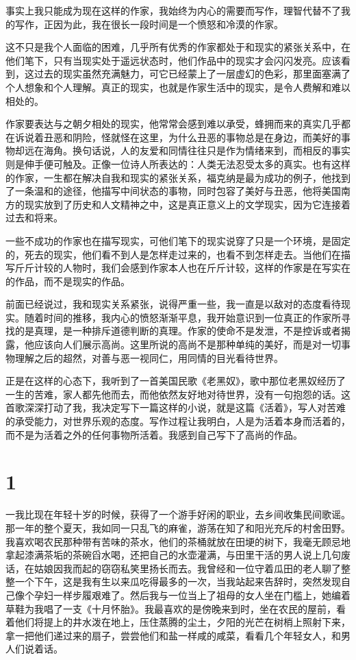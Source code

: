 \documentclass[12pt,UTF8]{ctexbook}
\begin{document}
事实上我只能成为现在这样的作家，我始终为内心的需要而写作，理智代替不了我的写作，正因为此，我在很长一段时间是一个愤怒和冷漠的作家。

这不只是我个人面临的困难，几乎所有优秀的作家都处于和现实的紧张关系中，在他们笔下，只有当现实处于遥远状态时，他们作品中的现实才会闪闪发亮。应该看到，这过去的现实虽然充满魅力，可它已经蒙上了一层虚幻的色彩，那里面塞满了个人想象和个人理解。真正的现实，也就是作家生活中的现实，是令人费解和难以相处的。

作家要表达与之朝夕相处的现实，他常常会感到难以承受，蜂拥而来的真实几乎都在诉说着丑恶和阴险，怪就怪在这里，为什么丑恶的事物总是在身边，而美好的事物却远在海角。换句话说，人的友爱和同情往往只是作为情绪来到，而相反的事实则是伸手便可触及。正像一位诗人所表达的：人类无法忍受太多的真实。也有这样的作家，一生都在解决自我和现实的紧张关系，福克纳是最为成功的例子，他找到了一条温和的途径，他描写中间状态的事物，同时包容了美好与丑恶，他将美国南方的现实放到了历史和人文精神之中，这是真正意义上的文学现实，因为它连接着过去和将来。

一些不成功的作家也在描写现实，可他们笔下的现实说穿了只是一个环境，是固定的，死去的现实，他们看不到人是怎样走过来的，也看不到怎样走去。当他们在描写斤斤计较的人物时，我们会感到作家本人也在斤斤计较，这样的作家是在写实在的作品，而不是现实的作品。

前面已经说过，我和现实关系紧张，说得严重一些，我一直是以敌对的态度看待现实。随着时间的推移，我内心的愤怒渐渐平息，我开始意识到一位真正的作家所寻找的是真理，是一种排斥道德判断的真理。作家的使命不是发泄，不是控诉或者揭露，他应该向人们展示高尚。这里所说的高尚不是那种单纯的美好，而是对一切事物理解之后的超然，对善与恶一视同仁，用同情的目光看待世界。

正是在这样的心态下，我听到了一首美国民歌《老黑奴》，歌中那位老黑奴经历了一生的苦难，家人都先他而去，而他依然友好地对待世界，没有一句抱怨的话。这首歌深深打动了我，我决定写下一篇这样的小说，就是这篇《活着》，写人对苦难的承受能力，对世界乐观的态度。写作过程让我明白，人是为活着本身而活着的，而不是为活着之外的任何事物所活着。我感到自己写下了高尚的作品。

\mainmatter

\chapter{1}

一我比现在年轻十岁的时候，获得了一个游手好闲的职业，去乡间收集民间歌谣。那一年的整个夏天，我如同一只乱飞的麻雀，游荡在知了和阳光充斥的村舍田野。我喜欢喝农民那种带有苦味的茶水，他们的茶桶就放在田埂的树下，我毫无顾忌地拿起漆满茶垢的茶碗舀水喝，还把自己的水壶灌满，与田里干活的男人说上几句废话，在姑娘因我而起的窃窃私笑里扬长而去。我曾经和一位守着瓜田的老人聊了整整一个下午，这是我有生以来瓜吃得最多的一次，当我站起来告辞时，突然发现自己像个孕妇一样步履艰难了。然后我与一位当上了祖母的女人坐在门槛上，她编着草鞋为我唱了一支《十月怀胎》。我最喜欢的是傍晚来到时，坐在农民的屋前，看着他们将提上的井水泼在地上，压住蒸腾的尘土，夕阳的光芒在树梢上照射下来，拿一把他们递过来的扇子，尝尝他们和盐一样咸的咸菜，看看几个年轻女人，和男人们说着话。
\end{document}
